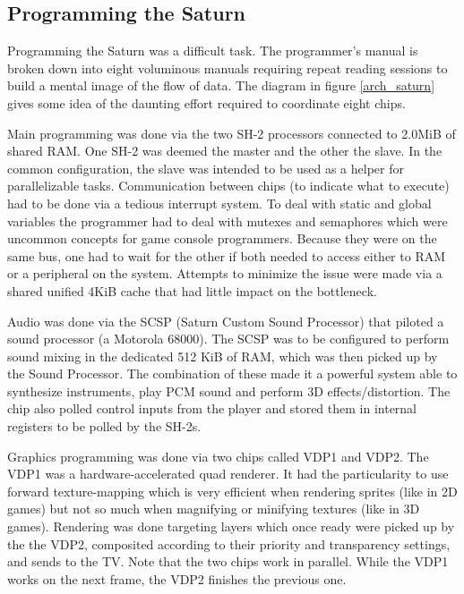 \subsection{Programming the Saturn}
Programming the Saturn was a difficult task. The programmer's manual is broken down into eight voluminous manuals requiring repeat reading sessions to build a mental image of the flow of data. The diagram in figure \ref{arch_saturn} gives some idea of the daunting effort required to coordinate eight chips.\\
\par
Main programming was done via the two SH-2 processors connected to 2.0MiB of shared RAM. One SH-2 was deemed the master and the other the slave. In the common configuration, the slave was intended to be used as a helper for parallelizable tasks. Communication between chips (to indicate what to execute) had to be done via a tedious interrupt system. To deal with static and global variables the programmer had to deal with mutexes and semaphores which were uncommon concepts for game console programmers. Because they were on the same bus, one had to wait for the other if both needed to access either to RAM or a peripheral on the system. Attempts to minimize the issue were made via a shared unified 4KiB cache that had little impact on the bottleneck.\\
\par
Audio was done via the SCSP (Saturn Custom Sound Processor) that piloted a sound processor (a Motorola 68000). The SCSP was to be configured to perform sound mixing in the dedicated 512 KiB of RAM, which was then picked up by the Sound Processor. The combination of these made it a powerful system able to synthesize instruments, play PCM sound and perform 3D effects/distortion. The chip also polled control inputs from the player and stored them in internal registers to be polled by the SH-2s.\\
\par
Graphics programming was done via two chips called VDP1 and VDP2. The VDP1 was a hardware-accelerated quad renderer. It had the particularity to use forward texture-mapping which is very efficient when rendering sprites (like in 2D games) but not so much when magnifying or minifying textures (like in 3D games). Rendering was done targeting layers which once ready were picked up by the the VDP2, composited according to their priority and transparency settings, and sends to the TV. Note that the two chips work in parallel. While the VDP1 works on the next frame, the VDP2 finishes the previous one.\\

